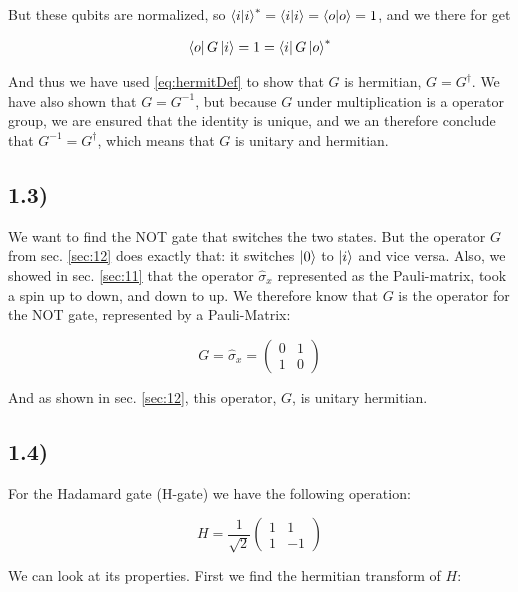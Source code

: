 \documentclass[a4paper,norsk, 10pt]{article}
\begin{document}
But these qubits are normalized, so $\braket{i}{i}^*=  \braket{i}{i}=  \braket{o}{o} = 1$, and we there for get

\begin{equation}
\bra{o}G\ket{i} = 1 = \bra{i}G\ket{o}^*
\end{equation}

And thus we have used \eqref{eq:hermitDef} to show that $G$ is hermitian, $G = G^\dagger$. We have also shown that $G = G^{-1}$, but because $G$ under multiplication is a operator group, we are ensured that the identity is unique, and we an therefore conclude that $G^{-1} = G^\dagger$, which means that $G$ is unitary and hermitian.

\subsection{1.3)}

We want to find the NOT gate that switches the two states. But the operator $G$ from sec. \ref{sec:12} does exactly that: it switches $\ket{0}$ to $\ket{i}$ and vice versa. Also, we showed in sec. \ref{sec:11} that the operator $\hat{\sigma}_x$ represented as the Pauli-matrix, took a spin up to down, and down to up. We therefore know that $G$ is the operator for the NOT gate, represented by a Pauli-Matrix:

\begin{equation}
G = \hat{\sigma}_x =
\begin{pmatrix}
0 & 1\\
1 & 0
\end{pmatrix}
\end{equation}

And as shown in sec. \ref{sec:12}, this operator, $G$, is unitary hermitian.

\subsection{1.4)}
For the Hadamard gate (H-gate) we have the following operation:

\begin{equation}
H = \frac{1}{\sqrt{2}}
\begin{pmatrix}
1 & 1 \\
1 & -1
\end{pmatrix}
\end{equation}\label{eq:H}

We can look at its properties. First we find the hermitian transform of $H$:
\end{document}
